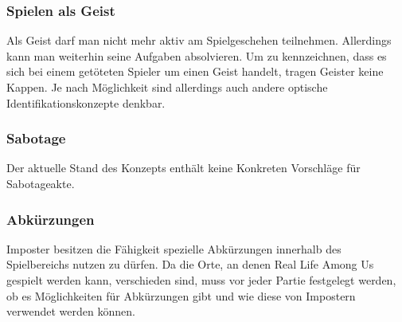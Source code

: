 \subsubsection{Spielen als Geist}
Als Geist darf man nicht mehr aktiv am Spielgeschehen teilnehmen. Allerdings
kann man weiterhin seine Aufgaben absolvieren. Um zu kennzeichnen, dass es sich
bei einem getöteten Spieler um einen Geist handelt, tragen Geister keine Kappen.
Je nach Möglichkeit sind allerdings auch andere optische Identifikationskonzepte
denkbar.

\subsubsection{Sabotage}
Der aktuelle Stand des Konzepts enthält keine Konkreten Vorschläge für
Sabotageakte.

\subsubsection{Abkürzungen}
Imposter besitzen die Fähigkeit spezielle Abkürzungen innerhalb des
Spielbereichs nutzen zu dürfen. Da die Orte, an denen Real Life Among Us
gespielt werden kann, verschieden sind, muss vor jeder Partie festgelegt werden,
ob es Möglichkeiten für Abkürzungen gibt und wie diese von Impostern verwendet
werden können.


